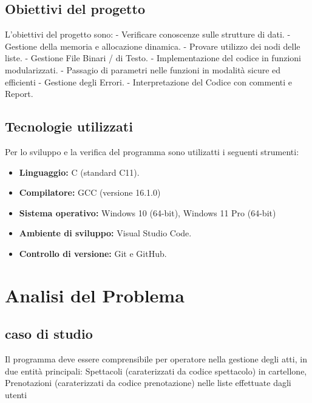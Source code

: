 \documentclass[11pt,a4paper,oneside,openany]{book}
\begin{document}
\section{Obiettivi del progetto}
L'obiettivi del progetto sono:
- Verificare conoscenze sulle strutture di dati.
- Gestione della memoria e allocazione dinamica.
- Provare utilizzo dei nodi delle liste.
- Gestione File Binari / di Testo.
- Implementazione del codice in funzioni modularizzati.
- Passagio di parametri nelle funzioni in modalità sicure ed efficienti
- Gestione degli Errori.
- Interpretazione del Codice con commenti e Report.

\section{Tecnologie utilizzati}

Per lo sviluppo e la verifica del programma sono utilizatti i seguenti strumenti:
\begin{itemize}

\item \textbf{Linguaggio:} C (standard C11).
\item \textbf{Compilatore:} GCC (versione 16.1.0)
\item \textbf{Sistema operativo:}  Windows 10 (64-bit), Windows 11 Pro (64-bit)
\item \textbf{Ambiente di sviluppo:} Visual Studio Code.
\item \textbf{Controllo di versione:} Git e GitHub.
\end{itemize}

\chapter{Analisi del Problema}
\section{caso di studio}
Il programma deve essere comprensibile per operatore nella gestione degli atti, in due entità principali: Spettacoli (caraterizzati da codice spettacolo) in cartellone, Prenotazioni (caraterizzati da codice prenotazione) nelle liste effettuate dagli utenti
\end{document}
